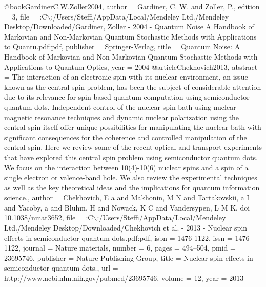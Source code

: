 @book{GardinerC.W.Zoller2004,
author = {Gardiner, C. W. and Zoller, P.},
edition = {3},
file = {:C$\backslash$:/Users/Steffi/AppData/Local/Mendeley Ltd./Mendeley Desktop/Downloaded/Gardiner, Zoller - 2004 - Quantum Noise A Handbook of Markovian and Non-Markovian Quantum Stochastic Methods with Applications to Quantu.pdf:pdf},
publisher = {Springer-Verlag},
title = {{Quantum Noise: A Handbook of Markovian and Non-Markovian Quantum Stochastic Methods with Applications to Quantum Optics}},
year = {2004}
}
@article{Chekhovich2013,
abstract = {The interaction of an electronic spin with its nuclear environment, an issue known as the central spin problem, has been the subject of considerable attention due to its relevance for spin-based quantum computation using semiconductor quantum dots. Independent control of the nuclear spin bath using nuclear magnetic resonance techniques and dynamic nuclear polarization using the central spin itself offer unique possibilities for manipulating the nuclear bath with significant consequences for the coherence and controlled manipulation of the central spin. Here we review some of the recent optical and transport experiments that have explored this central spin problem using semiconductor quantum dots. We focus on the interaction between 10(4)-10(6) nuclear spins and a spin of a single electron or valence-band hole. We also review the experimental techniques as well as the key theoretical ideas and the implications for quantum information science.},
author = {Chekhovich, E a and Makhonin, M N and Tartakovskii, a I and Yacoby, a and Bluhm, H and Nowack, K C and Vandersypen, L M K},
doi = {10.1038/nmat3652},
file = {:C$\backslash$:/Users/Steffi/AppData/Local/Mendeley Ltd./Mendeley Desktop/Downloaded/Chekhovich et al. - 2013 - Nuclear spin effects in semiconductor quantum dots.pdf:pdf},
isbn = {1476-1122},
issn = {1476-1122},
journal = {Nature materials},
number = {6},
pages = {494--504},
pmid = {23695746},
publisher = {Nature Publishing Group},
title = {{Nuclear spin effects in semiconductor quantum dots.}},
url = {http://www.ncbi.nlm.nih.gov/pubmed/23695746},
volume = {12},
year = {2013}
}
